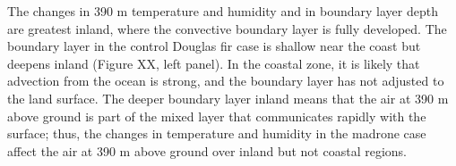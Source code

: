 The changes in 390 m temperature and humidity and in boundary layer depth are greatest inland, where the convective boundary layer is fully developed.  The boundary layer in the control Douglas fir case is shallow near the coast but deepens inland (Figure XX, left panel).  In the coastal zone, it is likely that advection from the ocean is strong, and the boundary layer has not adjusted to the land surface.  The deeper boundary layer inland means that the air at 390 m above ground is part of the mixed layer that communicates rapidly with the surface; thus, the changes in temperature and humidity in the madrone case affect the air at 390 m above ground over inland but not coastal regions.


